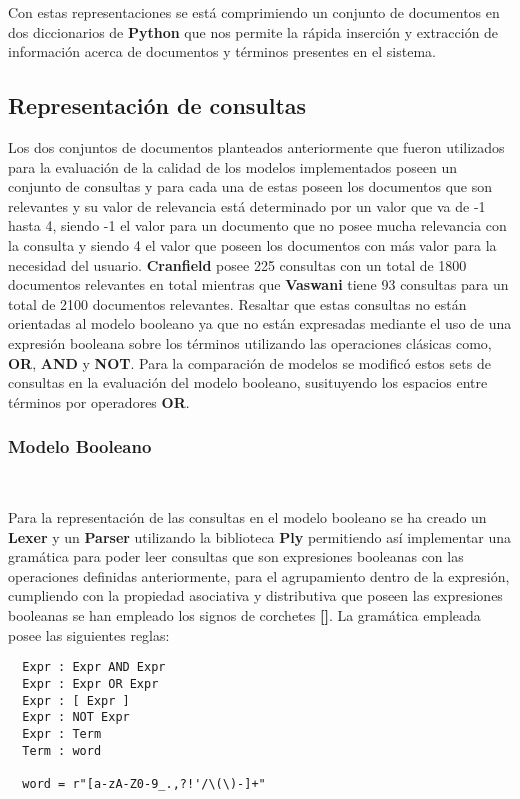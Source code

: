 \documentclass{llncs}
\begin{document}
Con estas representaciones se está comprimiendo un conjunto de documentos en dos diccionarios de {\bfseries Python} que nos permite la rápida inserción y extracción de información acerca de documentos y términos presentes en el sistema.

\subsection{Representación de consultas}

Los dos conjuntos de documentos planteados anteriormente que fueron utilizados para la evaluación de la calidad de los modelos implementados poseen un conjunto de consultas y para cada una de estas poseen los documentos que son relevantes y su valor de relevancia está determinado por un valor que va de -1 hasta 4, siendo -1 el valor para un documento que no posee mucha relevancia con la consulta y siendo 4 el valor que poseen los documentos con más valor para la necesidad del usuario. {\bfseries Cranfield} posee 225 consultas con un total de 1800 documentos relevantes en total mientras que {\bfseries Vaswani} tiene 93 consultas para un total de 2100 documentos relevantes. Resaltar que estas consultas no están orientadas al modelo booleano ya que no están expresadas mediante el uso de una expresión booleana sobre los términos utilizando las operaciones clásicas como, {\bfseries OR}, {\bfseries AND} y {\bfseries NOT}. Para la comparación de modelos se modificó estos sets de consultas en la evaluación del modelo booleano, susituyendo los espacios entre términos por operadores {\bfseries OR}.

\subsubsection{Modelo Booleano}\

Para la representación de las consultas en el modelo booleano se ha creado un {\bfseries Lexer} y un {\bfseries Parser} utilizando la biblioteca {\bfseries Ply} permitiendo así implementar una gramática para poder leer consultas que son expresiones booleanas con las operaciones definidas anteriormente, para el agrupamiento dentro de la expresión, cumpliendo con la propiedad asociativa y distributiva que poseen las expresiones booleanas se han empleado los signos de corchetes {\bfseries []}. La gramática empleada posee las siguientes reglas:

\begin{verbatim}
  Expr : Expr AND Expr 
  Expr : Expr OR Expr 
  Expr : [ Expr ]
  Expr : NOT Expr
  Expr : Term
  Term : word

  word = r"[a-zA-Z0-9_.,?!'/\(\)-]+"
\end{verbatim}
\end{document}

